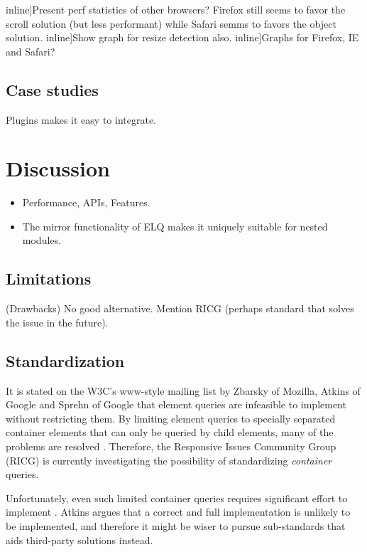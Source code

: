 \documentclass{acm_proc_article-sp}
\newcommand{\elq}{ELQ}
\newcommand{\todo}[1]{}
\begin{document}
      \todo[inline]{Present perf statistics of other browsers? Firefox still seems to favor the scroll solution (but less performant) while Safari semms to favors the object solution.}
      \todo[inline]{Show graph for resize detection also.}
      \todo[inline]{Graphs for Firefox, IE and Safari?}
  \subsection{Case studies}
    Plugins makes it easy to integrate.



\section{Discussion}
  \begin{itemize}
    \item Performance, APIs, Features.
    \item The mirror functionality of \elq{} makes it uniquely suitable for nested modules.
  \end{itemize}

  \subsection{Limitations}
    (Drawbacks)
    No good alternative.
    Mention RICG (perhaps standard that solves the issue in the future).


  \subsection{Standardization}
    It is stated on the W3C's www-style mailing list \cite{w3c_eq_mail} by Zbarsky of Mozilla, Atkins of Google and Sprehn of Google that element queries are infeasible to implement without restricting them.
    By limiting element queries to specially separated container elements that can only be queried by child elements, many of the problems are resolved \cite{ricg_irc_log,ricg_issue_viewport}.
    Therefore, the Responsive Issues Community Group (RICG) is currently investigating the possibility of standardizing \emph{container} queries.

    Unfortunately, even such limited container queries requires significant effort to implement \cite{ricg_issue_viewport}.
    Atkins argues that a correct and full implementation is unlikely to be implemented, and therefore it might be wiser to pursue sub-standards that aids third-party solutions instead.
   
\end{document}
